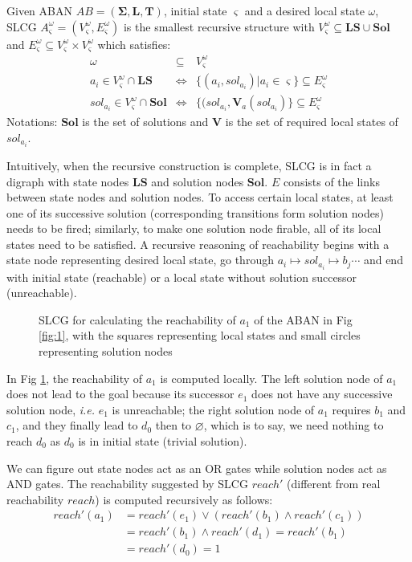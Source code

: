 \documentclass[runningheads]{llncs}
\newcommand{\omesi}{^\omega_\varsigma}
\begin{document}
\begin{definition}[SLCG]\label{defLCG}
Given ABAN $AB = (\mathbf{\Sigma},\mathbf{L},\mathbf{T})$, initial state $\varsigma$ and a desired local state $\omega$, SLCG $A\omesi= (V\omesi,E\omesi)$ is the smallest recursive structure with $V\omesi \subseteq \mathbf{LS}\cup \mathbf{Sol}$ and $E\omesi \subseteq V\omesi\times V\omesi$ which satisfies:
\begin{eqnarray*}
\omega&\subseteq& V\omesi \\
a_i\in V\omesi\cap \mathbf{LS} &\Leftrightarrow& \{ (a_i, sol_{a_i})| a_i\in \varsigma\}\subseteq E\omesi \\
sol_{a_i}\in V\omesi \cap \mathbf{Sol}&\Leftrightarrow& \{ (sol_{a_i},\mathbf{V}_a (sol_{a_i})\}\subseteq E\omesi
\end{eqnarray*}
Notations: $\mathbf{Sol}$ is the set of solutions and $\mathbf{V}$ is the set of required local states of $sol_{a_i}$.
\end{definition}
Intuitively, when the recursive construction is complete, SLCG is in fact a digraph with state nodes $\mathbf{LS}$ and solution nodes $\mathbf{Sol}$. 
$E$ consists of the links between state nodes and solution nodes. 
To access certain local states, at least one of its successive solution (corresponding transitions form solution nodes) needs to be fired; similarly, to make one solution node firable, all of its local states need to be satisfied. 
A recursive reasoning of reachability begins with a state node representing desired local state, go through $a_i\mapsto sol_{a_i}\mapsto b_j \cdots$ and end with initial state (reachable) or a local state without solution successor (unreachable).

\begin{figure}[!ht]
\centering

\caption{SLCG for calculating the reachability of $a_1$ of the ABAN in Fig \ref{fig:1}, with the squares representing local states and small circles representing solution nodes}
\label{fig:2}
\end{figure}
In Fig \ref{fig:2}, the reachability of $a_1$ is computed locally. 
The left solution node of $a_1$ does not lead to the goal because its successor $e_1$ does not have any successive solution node, \textit{i.e.} $e_1$ is unreachable;
the right solution node of $a_1$ requires $b_1$ and $c_1$, and they finally lead to $d_0$ then to $\varnothing$, which is to say, we need nothing to reach $d_0$ as $d_0$ is in initial state (trivial solution).

We can figure out state nodes act as an OR gates while solution nodes act as AND gates. The reachability suggested by SLCG $reach'$ (different from real reachability $reach$) is computed recursively as follows:
\begin{align*}
reach'(a_1)&=reach'(e_1)\lor (reach'(b_1)\land reach'(c_1))\\
&=reach'(b_1)\land reach'(d_1)=reach'(b_1)\\
&=reach'(d_0)=1
\end{align*}
\end{document}
